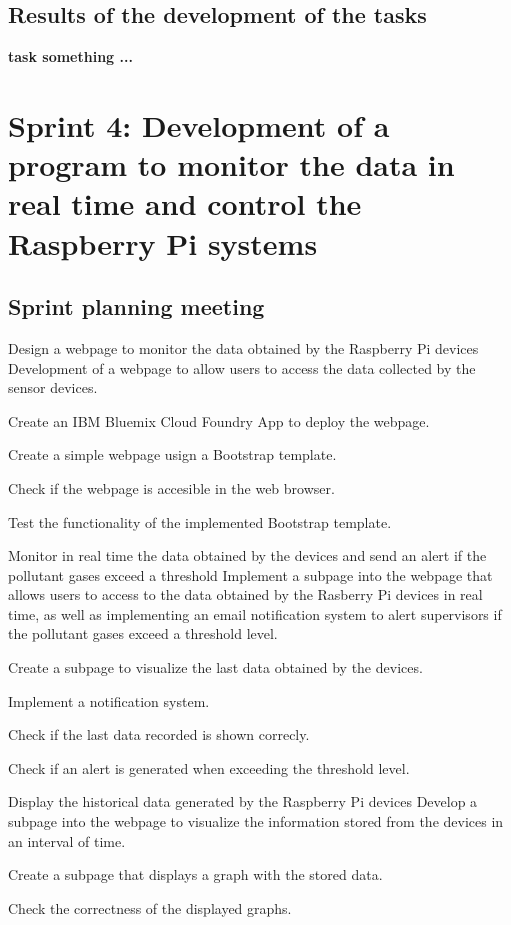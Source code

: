 
\subsection{Results of the development of the tasks}
\textbf{task something ...}



\section{Sprint 4: Development of a program to monitor the data in real time and control the Raspberry Pi systems}

\subsection{Sprint planning meeting}

{Design a webpage to monitor the data obtained by the Raspberry Pi devices}
{Development of a webpage to allow users to access the data collected by the sensor devices.}
{	\item Create an IBM Bluemix Cloud Foundry App to deploy the webpage.
	\item Create a simple webpage usign a Bootstrap template.
}{	\item Check if the webpage is accesible in the web browser.
	\item Test the functionality of the implemented Bootstrap template.
}

{Monitor in real time the data obtained by the devices and send an alert if the pollutant gases exceed a threshold}
{Implement a subpage into the webpage that allows users to access to the data obtained by the Rasberry Pi devices in real time, as well as implementing an email notification system to alert supervisors if the pollutant gases exceed a threshold level.}
{	\item Create a subpage to visualize the last data obtained by the devices.
	\item Implement a notification system.
}{	\item Check if the last data recorded is shown correcly.
	\item Check if an alert is generated when exceeding the threshold level.
}

{Display the historical data generated by the Raspberry Pi devices}
{Develop a subpage into the webpage to visualize the information stored from the devices in an interval of time.}
{	\item Create a subpage that displays a graph with the stored data.
}{	\item Check the correctness of the displayed graphs.
}



